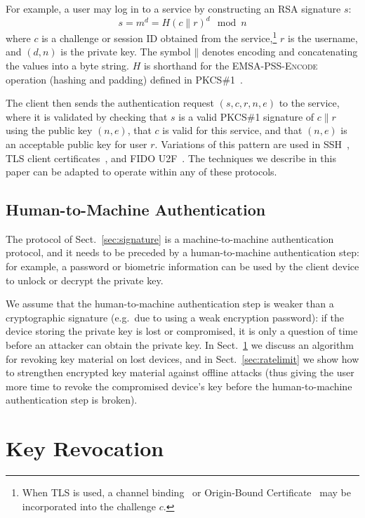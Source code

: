 \documentclass{llncs}
\newcommand*{\concat}{\mathbin{\|}}
\begin{document}
For example, a user may log in to a service by constructing an RSA signature $s$:
\begin{equation}
s = m^d = H(c \concat r)^d \mod n
\end{equation}
where $c$ is a challenge or session ID obtained from the service,\footnote{When TLS is used, a
channel binding~\cite{ChannelBinding} or Origin-Bound Certificate~\cite{Dietz12} may be incorporated
into the challenge $c$.} $r$ is the username, and $(d, n)$ is the private key. The symbol $\concat$
denotes encoding and concatenating the values into a byte string. $H$ is shorthand for the
\textsc{EMSA-PSS-Encode} operation (hashing and padding) defined in PKCS\#1~\cite{PKCS1}.

The client then sends the authentication request $(s, c, r, n, e)$ to the service, where it is
validated by checking that $s$ is a valid PKCS\#1 signature of $c \concat r$ using the public key
$(n, e)$, that $c$ is valid for this service, and that $(n, e)$ is an acceptable public key for user
$r$. Variations of this pattern are used in SSH~\cite{SSH}, TLS client certificates~\cite{TLS}, and
FIDO U2F~\cite{FIDOOverview}. The techniques we describe in this paper can be adapted to operate
within any of these protocols.

\subsection{Human-to-Machine Authentication}\label{sec:human-to-machine}

The protocol of Sect.~\ref{sec:signature} is a machine-to-machine authentication protocol, and it
needs to be preceded by a human-to-machine authentication step: for example, a password or biometric
information can be used by the client device to unlock or decrypt the private key.

We assume that the human-to-machine authentication step is weaker than a cryptographic signature
(e.g.\ due to using a weak encryption password): if the device storing the private key is lost or
compromised, it is only a question of time before an attacker can obtain the private key. In
Sect.~\ref{sec:revocation} we discuss an algorithm for revoking key material on lost devices, and in
Sect.~\ref{sec:ratelimit} we show how to strengthen encrypted key material against offline attacks
(thus giving the user more time to revoke the compromised device's key before the human-to-machine
authentication step is broken).

\section{Key Revocation}\label{sec:revocation}
\end{document}
